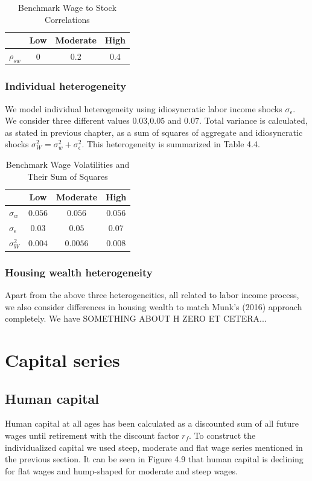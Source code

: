 \begin{table}
	\centering
	\caption{Benchmark Wage to Stock Correlations}
	\begin{tabular}[c]{c|ccc}
		&Low&Moderate&High\\
		\hline
		$\rho_{sw}$&0&0.2&0.4
	\end{tabular}
\end{table}


\subsubsection{Individual heterogeneity}

We model individual heterogeneity using idiosyncratic labor income shocks $\sigma_{\epsilon}$. We consider three different values $0.03$,$0.05$ and $0.07$. Total variance is calculated, as stated in previous chapter, as a sum of squares of aggregate and idiosyncratic shocks $\sigma^2_W = \sigma^2_w + \sigma^2_{\epsilon}$. This heterogeneity is summarized in Table 4.4. 


\begin{table}
	\centering
	\caption{Benchmark Wage Volatilities and Their Sum of Squares}
	\begin{tabular}[c]{l|ccc}
		&Low&Moderate&High\\
		\hline
		$\sigma_w$&$0.056$&$0.056$&$0.056$\\
		$\sigma_{\epsilon}$&$0.03$&$0.05$&$0.07$\\
		\hline
		$\sigma^2_{W}$&$0.004$&$0.0056$&$0.008$
	\end{tabular}
\end{table}


\subsubsection{Housing wealth heterogeneity}

Apart from the above three heterogeneities, all related to labor income process, we also consider differences in housing wealth to match Munk's (2016) approach completely. We have SOMETHING ABOUT H ZERO ET CETERA...



\section{Capital series}

\subsection{Human capital}
Human capital at all ages has been calculated as a discounted sum of all future wages until retirement with the discount factor $r_f$. To construct the individualized capital we used steep, moderate and flat wage series mentioned in the previous section. It can be seen in Figure 4.9 that human capital is declining for flat wages and hump-shaped for moderate and steep wages. 

